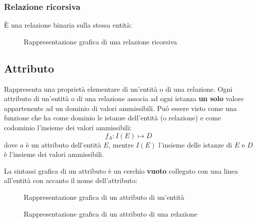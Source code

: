 \documentclass[a4paper]{article}
\begin{document}
\subsubsection{Relazione ricorsiva}
È una relazione binaria sulla stessa entità:
\begin{figure}[H]
  \centering
  \caption{Rappresentazione grafica di una relazione ricorsiva}
\end{figure}

\subsection{Attributo}
Rappresenta una proprietà elementare di un'entità o di una relazione.
Ogni attributo di un'entità o di una relazione associa ad ogni istanza \textbf{un solo}
valore appartenente ad un dominio di valori ammissibili. Può essere visto
come una funzione che ha come dominio le istanze dell'entità (o relazione) e come
codominio l'insieme dei valori ammissibili:
\[
  f_A: I(E) \mapsto D
\] 
dove \( a \) è un attributo dell'entità \( E \), mentre \( I(E) \) l'insieme delle
istanze di \( E \) e \( D \) è l'insieme dei valori ammissibili.

\vspace{1em}
\noindent
La sintassi grafica di un attributo è un cerchio \textbf{vuoto} collegato con una linea all'entità
con accanto il nome dell'attributo:
\begin{figure}[H]
  \centering
  \caption{Rappresentazione grafica di un attributo di un'entità}
\end{figure}

\begin{figure}[H]
  \centering
  \caption{Rappresentazione grafica di un attributo di una relazione}
\end{figure}
\end{document}

